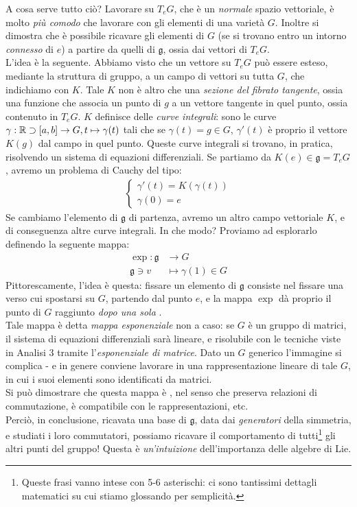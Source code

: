 \documentclass[../../FisicaTeorica.tex]{subfiles}
\begin{document}
\begin{expl}
A cosa serve tutto ciò? Lavorare su $T_e G$, che è un \textit{normale} spazio vettoriale, è molto \textit{più comodo} che lavorare con gli elementi di una varietà $G$. Inoltre si dimostra che è possibile ricavare gli elementi di $G$ (se si trovano entro un intorno \textit{connesso} di $e$) a partire da quelli di $\mathfrak{g}$, ossia dai vettori di $T_eG$.\\
L'idea è la seguente. Abbiamo visto che un vettore su $T_eG$ può essere esteso, mediante la struttura di gruppo, a un campo di vettori su tutta $G$, che indichiamo con $K$. Tale $K$ non è altro che una \textit{sezione del fibrato tangente}, ossia una funzione che associa un punto di $g$ a un vettore tangente in quel punto, ossia contenuto in $T_eG$. $K$ definisce delle \textit{curve integrali}: sono le curve $\gamma:\mathbb{R}\supset [a,b] \to G, t\mapsto \gamma(t)$ tali che se $\gamma(t)=g \in G$, $\gamma'(t)$ è proprio il vettore $K(g)$  dal campo in quel punto. Queste curve integrali si trovano, in pratica, risolvendo un sistema di equazioni differenziali. Se partiamo da $K(e) \in \mathfrak{g} = T_eG$, avremo un problema di Cauchy del tipo:
\begin{align*}
\begin{cases}
\gamma'(t) = K(\gamma(t))\\
\gamma(0) = e
\end{cases}
\end{align*}
Se cambiamo l'elemento di $\mathfrak{g}$ di partenza, avremo un altro campo vettoriale $K$, e di conseguenza altre curve integrali. In che modo? Proviamo ad esplorarlo definendo la seguente mappa:
\begin{align*}
\exp: \mathfrak{g}&\to G\\
\mathfrak{g} \ni v &\mapsto \gamma(1) \in G
\end{align*}
Pittorescamente, l'idea è questa: fissare un elemento di $\mathfrak{g}$ consiste nel fissare una  verso cui spostarsi su $G$, partendo dal punto $e$, e la mappa $\exp$ dà proprio il punto di $G$ raggiunto \textit{dopo una sola }.\\
Tale mappa è detta \textit{mappa esponenziale} non a caso: se $G$ è un gruppo di matrici, il sistema di equazioni differenziali sarà lineare, e risolubile con le tecniche viste in Analisi 3 tramite l'\textit{esponenziale di matrice}. Dato un $G$ generico l'immagine si complica - e in genere conviene lavorare in una rappresentazione lineare di tale $G$, in cui i suoi elementi sono identificati da matrici.\\
Si può dimostrare che questa mappa è , nel senso che preserva relazioni di commutazione, è compatibile con le rappresentazioni, etc.\\
Perciò, in conclusione, ricavata una base di $\mathfrak{g}$, data dai \textit{generatori} della simmetria, e studiati i loro commutatori, possiamo ricavare il comportamento di tutti\footnote{Queste frasi vanno intese con 5-6 asterischi: ci sono tantissimi dettagli matematici su cui stiamo glossando per semplicità.} gli altri punti del gruppo! Questa è \textit{un'intuizione} dell'importanza delle algebre di Lie.\\


\end{expl}
\end{document}
